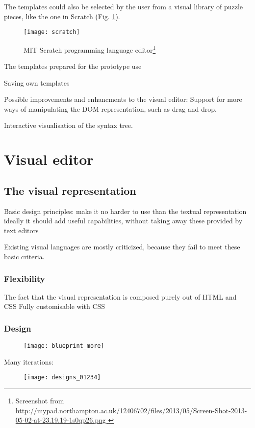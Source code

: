 The templates could also be selected by the user from a visual library of puzzle pieces, like the one in Scratch (Fig. \ref{fig:scratch}).
\begin{figure}[h!]
\centering
\texttt{[image: scratch]}
\caption{ MIT Scratch programming language editor\protect\footnote{ Screenshot from \url{
http://mypad.northampton.ac.uk/12406702/files/2013/05/Screen-Shot-2013-05-02-at-23.19.19-1s0qp26.png } } }
\label{fig:scratch}
\end{figure}

The templates prepared for the prototype use 

Saving own templates

Possible improvements and enhancments to the visual editor:
Support for more ways of manipulating the DOM representation, such as drag and drop.

Interactive visualisation of the syntax tree.


\section{Visual editor}
\subsection{The visual representation}
Basic design principles:
make it no harder to use than the textual representation
ideally it should add useful capabilities, without taking away these provided by text editors

Existing visual languages are mostly criticized, because they fail to meet these basic criteria.

\subsubsection{Flexibility}
The fact that the visual representation is composed purely out of HTML and CSS 
Fully customisable with CSS

\subsubsection{Design}
\begin{figure}[h!]
\centering
\texttt{[image: blueprint\_more]}
\caption{}
\label{fig:blueprint_more}
\end{figure}

Many iterations:

\begin{figure}[h!]
\centering
\texttt{[image: designs\_01234]}
\caption{}
\label{fig:designs_01234}
\end{figure}

